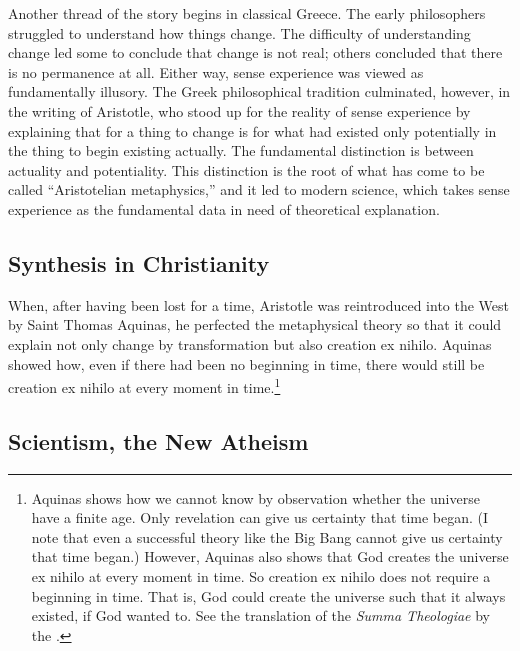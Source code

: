 \documentclass[twocolumn]{article}
\begin{document}
Another thread of the story begins in classical Greece.  The early philosophers
struggled to understand how things change.  The difficulty of understanding
change led some to conclude that change is not real; others concluded that
there is no permanence at all. Either way, sense experience was viewed as
fundamentally illusory.  The Greek philosophical tradition culminated, however,
in the writing of Aristotle, who stood up for the reality of sense experience
by explaining that for a thing to change is for what had existed only
potentially in the thing to begin existing actually.  The fundamental
distinction is between actuality and potentiality.  This distinction is the
root of what has come to be called ``Aristotelian metaphysics,'' and it led to
modern science, which takes sense experience as the fundamental data in need of
theoretical explanation.

\subsection{Synthesis in Christianity}

When, after having been lost for a time, Aristotle was reintroduced into the
West by Saint Thomas Aquinas, he perfected the metaphysical theory so that it
could explain not only change by transformation but also creation ex nihilo.
Aquinas showed how, even if there had been no beginning in time, there would
still be creation ex nihilo at every moment in time.\footnote{%
   Aquinas shows how we cannot know by observation whether the universe have a
   finite age.  Only revelation can give us certainty that time began.  (I note
   that even a successful theory like the Big Bang cannot give us certainty
   that time began.)  However, Aquinas also shows that God creates the universe
   ex nihilo at every moment in time.  So creation ex nihilo does not require a
   beginning in time.  That is, God could create the universe such that it
   always existed, if God wanted to.  See the translation of the {\it Summa
   Theologiae} by the \citet[I, Q45, A1, and I, Q46, A1]{e1920}.
}

\subsection{Scientism, the New Atheism}
\end{document}
